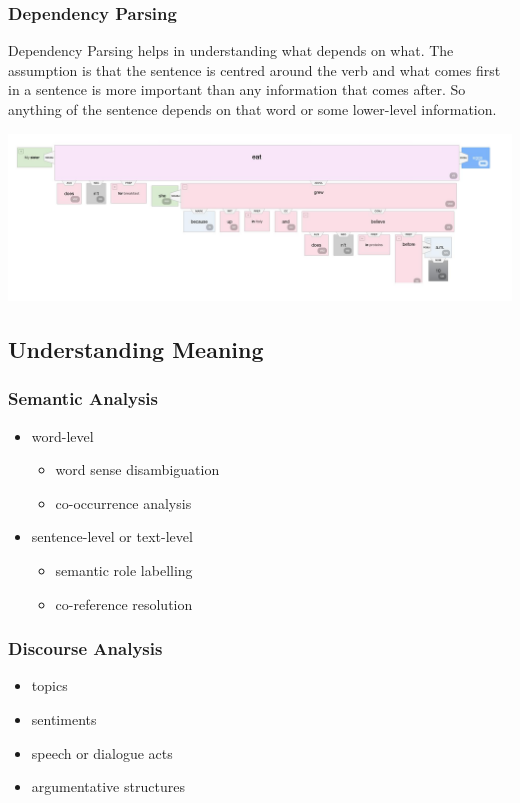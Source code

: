 \documentclass[11pt]{article}
\begin{document}
\subsubsection{Dependency Parsing}
Dependency Parsing helps in understanding what depends on what. The assumption is that the sentence is centred around the verb and what comes first in a sentence is more important than any information that comes after. So anything of the sentence depends on that word or some lower-level information.

\begin{center}
	\includegraphics[width=\linewidth]{img/parse_tree_dependency_parsing}
\end{center}

\subsection{Understanding Meaning}
\subsubsection{Semantic Analysis}
\begin{itemize}
	\item word-level
	\begin{itemize}
		\item word sense disambiguation
		\item co-occurrence analysis
	\end{itemize}
	\item sentence-level or text-level
	\begin{itemize}
		\item semantic role labelling
		\item co-reference resolution
	\end{itemize}
\end{itemize}

\subsubsection{Discourse Analysis}
\begin{itemize}
	\item topics
	\item sentiments
	\item speech or dialogue acts
	\item argumentative structures
\end{itemize}
\end{document}
